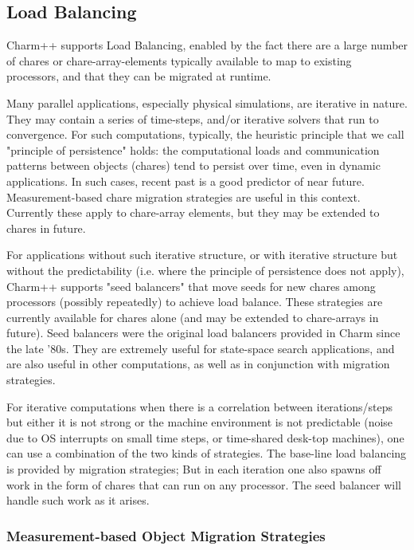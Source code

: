 
\subsection{Load Balancing}
\label{loadbalancing}


Charm++ supports Load Balancing, enabled by the fact there are a large
number of chares or chare-array-elements typically available to map to
existing processors, and that they can be migrated at runtime.

Many parallel applications, especially physical simulations, are
iterative in nature. They may contain a series of time-steps, and/or
iterative solvers that run to convergence. For such computations,
typically, the heuristic principle that we call "principle of
persistence" holds: the computational loads and communication patterns
between objects (chares) tend to persist over time, even in dynamic
applications. In such cases, recent past is a good predictor of near
future. Measurement-based chare migration strategies are useful in
this context. Currently these apply to chare-array elements, but they
may be extended to chares in future.

For applications without such iterative structure, or with iterative
structure but without the predictability (i.e. where the principle of
persistence does not apply), Charm++ supports "seed balancers" that
move seeds for new chares among processors (possibly repeatedly) to
achieve load balance. These strategies are currently available for
chares alone (and may be extended to chare-arrays in future). Seed
balancers were the original load balancers provided in Charm since the
late '80s. They are extremely useful for state-space search
applications, and are also useful in other computations, as well as in
conjunction with migration strategies.

For iterative computations when there is a correlation between
iterations/steps but either it is not strong or the machine
environment is not predictable (noise due to OS interrupts on small
time steps, or time-shared desk-top machines), one can use a
combination of the two kinds of strategies. The base-line load
balancing is provided by migration strategies; But in each iteration
one also spawns off work in the form of chares that can run on any
processor. The seed balancer will handle such work as it arises.

\subsubsection{Measurement-based Object Migration Strategies}
\label{lbFramework}
\label{migrationlb}

